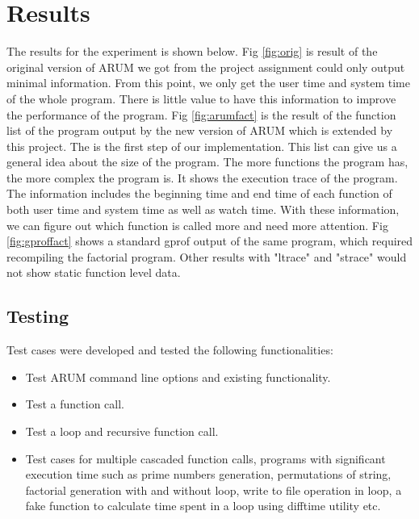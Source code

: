\documentclass[11pt,letterpaper,oneside]{article}
\begin{document}
\section{Results}
\label{sec:resultsa}

The results for the experiment is shown below.   Fig \ref{fig:orig} is result of the original version of ARUM we got from the project assignment could only output minimal information. From this point, we only get the user time and system time of the whole program. There is little value to have this information to improve the performance of the program. Fig \ref{fig:arumfact} is the result of the function list of the program output by the new version of ARUM which is extended by this project. The is the first step of our implementation. This list can give us a general idea about the size of the program. The more functions the program has, the more complex the program is. It shows the execution trace of the program. The information includes the beginning time and end time of each function of both user time and system time as well as watch time. With these information, we can figure out which function is called more and need more attention.  Fig \ref{fig:gproffact} shows a standard gprof output of the same program, which required recompiling the factorial program.   Other results with "ltrace" and "strace" would not show static function level data.

\subsection{Testing}

Test cases were developed and tested the following functionalities:
\begin{itemize}
\item Test ARUM command line options and existing functionality.
\item Test a function call.
\item Test a loop and recursive function call.
\item Test cases for multiple cascaded function calls, programs with significant execution time such as prime numbers generation, permutations of string, factorial generation with and without loop, write to file operation in loop,  a fake function to calculate time spent in a loop using difftime utility etc. 
\end{itemize}
\end{document}
